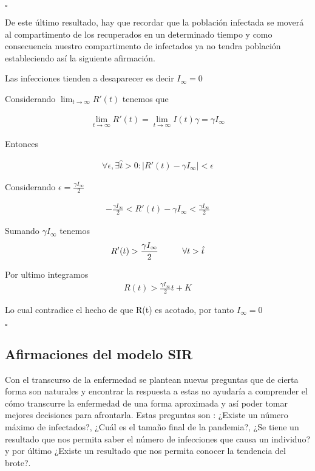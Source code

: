 \hfill	$\square$

De este último resultado, hay que recordar que la población infectada se moverá al compartimento de los recuperados en un determinado tiempo y como consecuencia nuestro compartimento
de infectados ya no tendra población estableciendo así la siguiente afirmación.

\begin{Af}
Las infecciones tienden a desaparecer es decir $I_{\infty} = 0$
\end{Af}

\begin{Dem}

Considerando $\lim_{t \to \infty} R'(t)$ tenemos que

\begin{align*}
\lim_{t \to \infty} R'(t) = \lim_{t \to \infty}  I (t) \gamma = \gamma I_{\infty}
\end{align*}

Entonces 

\begin{align*}
\forall \epsilon, \exists \hat{t} > 0 : |R'(t) - \gamma	I_{\infty}| < \epsilon 
\end{align*}

Considerando $\epsilon = \frac{\gamma	I_{\infty}}{2}$

\begin{align*}
 - \frac{\gamma	I_{\infty}}{2} < R'(t) - \gamma	I_{\infty} < \frac{\gamma	I_{\infty}}{2}
\end{align*}

Sumando  $\gamma I_{\infty}$ tenemos
\begin{align*}
R'(t) > \frac{\gamma I_{\infty}}{2} \hspace{1 cm} \forall t > \hat{t}
\end{align*}

Por ultimo integramos 
\begin{align*}
R(t) > \frac{\gamma I_{\infty}}{2} t  + K
\end{align*}

Lo cual contradice el hecho de que R(t) es acotado, por tanto $I_{\infty} = 0$

\end{Dem}

\hfill	$\square$

\subsection{Afirmaciones del modelo SIR}
Con el transcurso de la enfermedad se plantean nuevas preguntas que de cierta forma son naturales y encontrar la respuesta a estas no ayudaría a comprender el cómo transcurre la enfermedad de una forma aproximada y así poder tomar mejores decisiones para afrontarla. Estas preguntas son : ¿Existe un número máximo de infectados?, ¿Cuál es el tamaño final de la pandemia?, ¿Se tiene un resultado que nos permita saber el número de infecciones que causa un individuo? y por último ¿Existe un resultado que nos permita conocer la tendencia del brote?.

